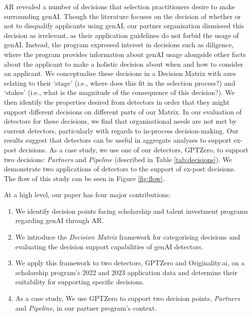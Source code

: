 AR revealed a number of decisions that selection practitioners desire to make surrounding genAI. Though the literature focuses on the decision of whether or not to disqualify applicants using genAI, our partner organisation dismissed this decision as irrelevant, as their application guidelines do not forbid the usage of genAI. Instead, the program expressed interest in decisions such as diligence, where the program provides information about genAI usage alongside other facts about the applicant to make a holistic decision about when and how to consider an applicant. We conceptualise these decisions in a Decision Matrix with axes relating to their `stage' (i.e., where does this fit in the selection process?) and `stakes' (i.e., what is the magnitude of the consequence of this decision?). We then identify the properties desired from detectors in order that they might support different decisions on different parts of our Matrix. In our evaluation of detectors for these decisions, we find that organisational needs are not met by current detectors, particularly with regards to in-process decision-making. Our results suggest that detectors can be useful in aggregate analyses to support ex-post decisions. As a case study, we use one of our detectors, GPTZero, to support two decisions: \emph{Partners} and \emph{Pipeline} (described in Table \ref{tab:decisions}). We demonstrate two applications of detectors to the support of ex-post decisions. The flow of this study can be seen in Figure \ref{fig:flow}.

At a high level, our paper has four major contributions:

\begin{enumerate}
    \item We identify decision points facing scholarship and talent investment programs regarding genAI through AR.
    \item We introduce the \emph{Decision Matrix} framework for categorising decisions and evaluating the decision support capabilities of genAI detectors.
    \item We apply this framework to two detectors, GPTZero and Originality.ai, on a scholarship program's 2022 and 2023 application data and determine their suitability for supporting specific decisions.
    \item As a case study, We use GPTZero to support two decision points, \emph{Partners} and \emph{Pipeline}, in our partner program's context.
\end{enumerate}

